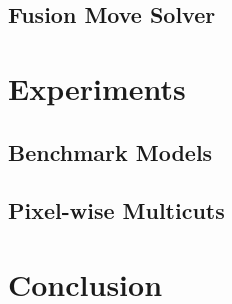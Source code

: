 \documentclass[10pt,twocolumn,letterpaper]{article}
\begin{document}



\subsection{Fusion Move Solver}


\section{Experiments}
\subsection{Benchmark Models}
\subsection{Pixel-wise Multicuts}



\section{Conclusion}

    



{\small


}
\end{document}
